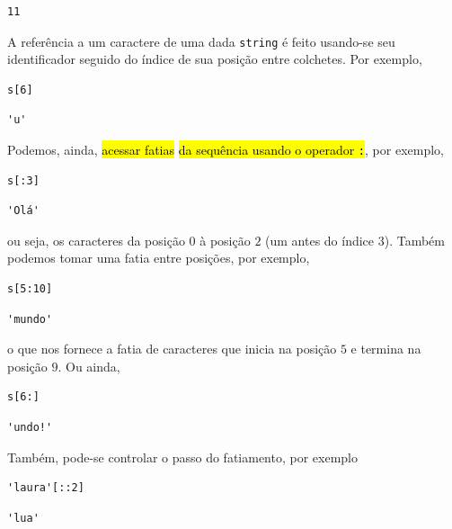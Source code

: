 \begin{verbatim}
11
\end{verbatim}

A referência a um caractere de uma dada \texttt{string} é feito usando-se seu identificador seguido do índice de sua posição entre colchetes. Por exemplo,

\begin{lstlisting}
s[6]
\end{lstlisting}

\begin{verbatim}
'u'
\end{verbatim}

Podemos, ainda, \hl{acessar fatias}\hl{ da sequência usando o operador \texttt{:}}, por exemplo,

\begin{lstlisting}
s[:3]
\end{lstlisting}

\begin{verbatim}
'Olá'
\end{verbatim}

ou seja, os caracteres da posição $0$ à posição $2$ (um antes do índice $3$). Também podemos tomar uma fatia entre posições, por exemplo,

\begin{lstlisting}
s[5:10]
\end{lstlisting}

\begin{verbatim}
'mundo'
\end{verbatim}

o que nos fornece a fatia de caracteres que inicia na posição $5$ e termina na posição $9$. Ou ainda,

\begin{lstlisting}
s[6:]
\end{lstlisting}

\begin{verbatim}
'undo!'
\end{verbatim}

Também, pode-se controlar o passo do fatiamento, por exemplo

\begin{lstlisting}
'laura'[::2]
\end{lstlisting}

\begin{verbatim}
'lua'
\end{verbatim}

